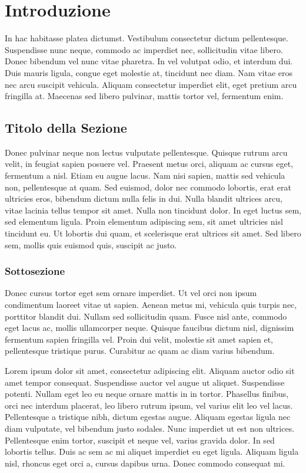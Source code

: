 \documentclass[target=bach,aauheader=,style=]{thud}
\begin{document}
\chapter{Introduzione}
In hac habitasse platea dictumst. Vestibulum consectetur dictum pellentesque. Suspendisse nunc neque, commodo ac imperdiet nec, sollicitudin vitae libero. Donec bibendum vel nunc vitae pharetra. In vel volutpat odio, et interdum dui. Duis mauris ligula, congue eget molestie at, tincidunt nec diam. Nam vitae eros nec arcu suscipit vehicula. Aliquam consectetur imperdiet elit, eget pretium arcu fringilla at. Maecenas \cite{Knu86} sed libero pulvinar, mattis tortor vel, fermentum enim.

\section{Titolo della Sezione}
Donec pulvinar neque non lectus vulputate pellentesque. Quisque rutrum arcu velit, in feugiat sapien posuere vel. Praesent metus orci, aliquam ac cursus eget, fermentum a nisl. Etiam eu augue lacus. Nam nisi sapien, mattis sed vehicula non, pellentesque at quam. Sed euismod, dolor nec commodo lobortis, erat erat ultricies eros, bibendum dictum nulla felis in dui. Nulla blandit ultrices arcu, vitae lacinia tellus tempor sit amet. Nulla non tincidunt dolor. In eget luctus sem, sed elementum ligula. Proin elementum adipiscing sem, sit amet ultricies nisl tincidunt eu. Ut lobortis dui quam, et scelerisque erat ultrices sit amet. Sed libero sem, mollis quis euismod quis, suscipit ac justo.

\subsection{Sottosezione}
Donec cursus tortor eget sem ornare imperdiet. Ut vel orci non ipsum condimentum laoreet vitae ut sapien. Aenean metus mi, vehicula quis turpis nec, porttitor blandit dui. Nullam sed sollicitudin quam. Fusce nisl ante, commodo eget lacus ac, mollis ullamcorper neque. Quisque faucibus dictum nisl, dignissim fermentum sapien fringilla vel. Proin dui velit, molestie sit amet sapien et, pellentesque tristique purus. Curabitur ac quam ac diam varius bibendum.

Lorem ipsum dolor sit amet, consectetur adipiscing elit. Aliquam auctor odio sit amet tempor consequat. Suspendisse auctor vel augue ut aliquet. Suspendisse potenti. Nullam eget leo eu neque ornare mattis in in tortor. Phasellus finibus, orci nec interdum placerat, leo libero rutrum ipsum, vel varius elit leo vel lacus. Pellentesque a tristique nibh, dictum egestas augue. Aliquam egestas ligula nec diam vulputate, vel bibendum justo sodales. Nunc imperdiet ut est non ultrices. Pellentesque enim tortor, suscipit et neque vel, varius gravida dolor. In sed lobortis tellus. Duis ac sem ac mi aliquet imperdiet eu eget ligula. Aliquam ligula nisl, rhoncus eget orci a, cursus dapibus urna. Donec commodo consequat mi.
\end{document}
